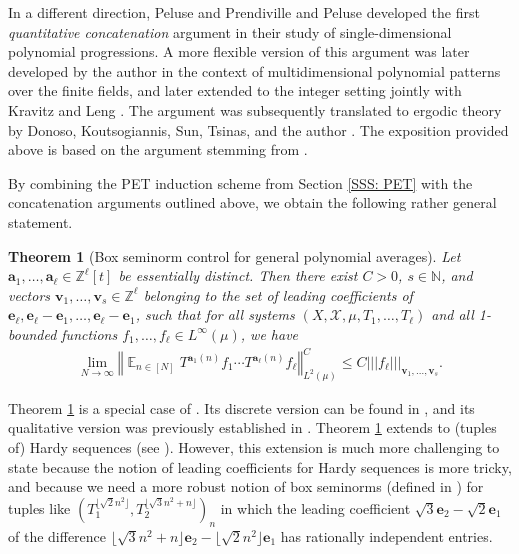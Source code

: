 \documentclass[11pt]{amsart}
\newtheorem{theorem}[lemma]{Theorem}
\theoremstyle{definition}
\DeclareMathOperator*{\E}{\mathbb{E}}
\newcommand{\N}{{\mathbb N}}
\newcommand{\Z}{{\mathbb Z}}
\newcommand{\CX}{{\mathcal X}}
\newcommand{\ba}{\mathbf{a}}
\newcommand{\be}{{\mathbf{e}}}
\newcommand{\bv}{{\mathbf{v}}}
\newcommand{\norm}[1]{\left\Vert #1\right\Vert}
\newcommand{\nnorm}[1]{\lvert\!|\!| #1|\!|\!\rvert}
\newcommand{\1}{{\mathbf{1}}}
\newcommand{\sfloor}[1]{{\lfloor #1 \rfloor}}
\begin{document}
In a different direction, Peluse and Prendiville \cite{PP19} and Peluse \cite{Pel20} developed the first \emph{quantitative concatenation} argument in their study of single-dimensional polynomial progressions. A more flexible version of this argument was later developed by the author \cite{Kuc23} in the context of multidimensional polynomial patterns over the finite fields, and later extended to the integer setting jointly with Kravitz and Leng \cite{KKL24a}. The argument was subsequently translated to ergodic theory by Donoso, Koutsogiannis, Sun, Tsinas, and the author \cite{DKKST24}. The exposition provided above is based on the argument stemming from \cite{DKKST24, KKL24a, Kuc23}.

By combining the PET induction scheme from Section \ref{SSS: PET} with the concatenation arguments outlined above, we obtain the following rather general statement.
\begin{theorem}[Box seminorm control for general polynomial averages]\label{T: DKKST box seminorm control}
    Let $\ba_1, \ldots, \ba_\ell\in\Z^\ell[t]$ be essentially distinct. Then there exist $C>0$, $s\in\N$, and vectors $\bv_1, \ldots, \bv_s\in\Z^\ell$ belonging to the set of leading coefficients of $\be_\ell, \be_\ell-\be_1, \ldots, \be_\ell-\be_1$, such that for all systems $(X, \CX, \mu, T_1, \ldots, T_\ell)$ and all 1-bounded functions $f_1, \ldots, f_\ell\in L^\infty(\mu)$, we have
    \begin{align*}
        \lim_{N\to\infty}\norm{\E_{n\in[N]}T^{\ba_1(n)}f_1\cdots T^{\ba_\ell(n)}f_\ell}_{L^2(\mu)}^C \leq C \nnorm{f_\ell}_{\bv_1, \ldots, \bv_s}.
    \end{align*}
\end{theorem}
Theorem \ref{T: DKKST box seminorm control} is a special case of \cite[Proposition 8.6]{DKKST24}. Its discrete version can be found in \cite[Theorem 1.1]{KKL24a}, and its qualitative version was previously established in \cite[Theorem 2.5]{DFKS22}. Theorem \ref{T: DKKST box seminorm control} extends to (tuples of) Hardy sequences (see \cite[Theorem 10.1]{DKKST24}). However, this extension is much more challenging to state because the notion of leading coefficients for Hardy sequences is more tricky, and because we need a more robust notion of box seminorms (defined in \cite[Section 3]{DKKST24}) for tuples like $(T_1^{\sfloor{\sqrt{2}n^2}}, T_2^{\sfloor{\sqrt{3}n^2 + n}})_n$ in which the leading coefficient $\sqrt{3}\be_2-\sqrt{2}\be_1$ of the difference $\sfloor{\sqrt{3}n^2 + n}\be_2-\sfloor{\sqrt{2}n^2}\be_1$ has rationally independent entries. 
\end{document}
